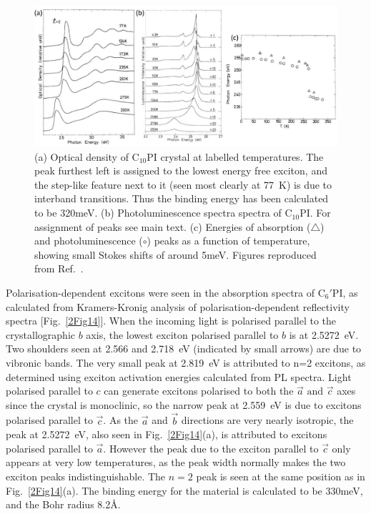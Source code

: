 \begin{figure}[ht]
\centering
\includegraphics[width=\textwidth]{Fig13}
\caption{(a) Optical density of $\textrm{C}_{10}$PI crystal at labelled temperatures. The peak furthest left is assigned to the lowest energy free exciton, and the step-like feature next to it (seen most clearly at 77~K) is due to interband transitions. Thus the binding energy has been calculated to be 320meV. (b) Photoluminescence spectra spectra of $\textrm{C}_{10}$PI. For assignment of peaks see main text. (c) Energies of absorption ($\triangle$) and photoluminescence ($\circ$) peaks as a function of temperature, showing small Stokes shifts of around 5meV. Figures reproduced from Ref.\ \cite{Ishihara1990}.}
\label{2Fig13}
\end{figure}

Polarisation-dependent excitons were seen in the absorption spectra of $\textrm{C}_6'$PI, as calculated from Kramers-Kronig analysis of polarisation-dependent reflectivity spectra [Fig.~\ref{2Fig14}]. When the incoming light is polarised parallel to the crystallographic $b$ axis, the lowest exciton polarised parallel to $b$ is at 2.5272~eV. Two shoulders seen at 2.566 and 2.718~eV (indicated by small arrows) are due to vibronic bands. The very small peak at 2.819~eV is attributed to n=2 excitons, as determined using exciton activation energies calculated from PL spectra. Light polarised parallel to $c$ can generate excitons polarised to both the $\vec{a}$ $\textrm{and}$ $\vec{c}$ axes since the crystal is monoclinic, so the narrow peak at 2.559~eV is due to excitons polarised parallel to $\vec{c}$. As the $\vec{a}$ and $\vec{b}$ directions are very nearly isotropic, the peak at 2.5272~eV, also seen in Fig.~\ref{2Fig14}(a), is attributed to excitons polarised parallel to $\vec{a}$. However the peak due to the exciton parallel to $\vec{c}$ only appears at very low temperatures, as the peak width normally makes the two exciton peaks indistinguishable. The $n=2$ peak is seen at the same position as in Fig.~\ref{2Fig14}(a). The binding energy for the material is calculated to be 330meV, and the Bohr radius 8.2\AA \cite{Goto2001}.

